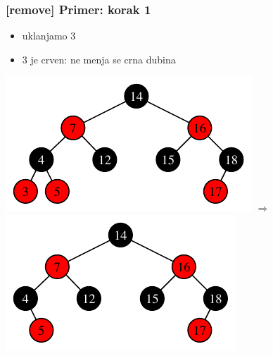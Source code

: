 \documentclass[compress,aspectratio=169]{beamer}
\begin{document}
\begin{frame}[fragile]
  \frametitle{[remove] Primer: korak 1}
  \begin{itemize}
    \item uklanjamo 3
    \item 3 je crven: ne menja se crna dubina
  \end{itemize}
  \begin{center}
    \includegraphics[scale=0.8]{asp-11-del-01.pdf} $\Rightarrow$
    \includegraphics[scale=0.8]{asp-11-del-02.pdf}
  \end{center}
\end{frame}
\end{document}
